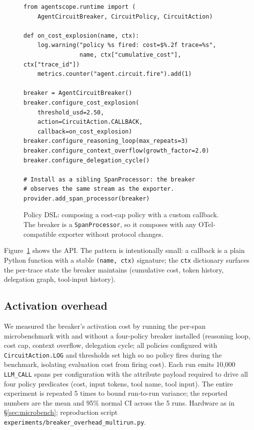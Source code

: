 \documentclass[sigplan,10pt,anonymous,review]{acmart}
\begin{document}
\begin{figure}[t]
\begin{lstlisting}
from agentscope.runtime import (
    AgentCircuitBreaker, CircuitPolicy, CircuitAction)

def on_cost_explosion(name, ctx):
    log.warning("policy %s fired: cost=$%.2f trace=%s",
                name, ctx["cumulative_cost"], ctx["trace_id"])
    metrics.counter("agent.circuit.fire").add(1)

breaker = AgentCircuitBreaker()
breaker.configure_cost_explosion(
    threshold_usd=2.50,
    action=CircuitAction.CALLBACK,
    callback=on_cost_explosion)
breaker.configure_reasoning_loop(max_repeats=3)
breaker.configure_context_overflow(growth_factor=2.0)
breaker.configure_delegation_cycle()

# Install as a sibling SpanProcessor: the breaker
# observes the same stream as the exporter.
provider.add_span_processor(breaker)
\end{lstlisting}
\caption{Policy DSL: composing a cost-cap policy with a custom
callback. The breaker is a \texttt{SpanProcessor}, so it composes
with any OTel-compatible exporter without protocol changes.}
\label{fig:policydsl}
\end{figure}

Figure~\ref{fig:policydsl} shows the API. The pattern is intentionally
small: a callback is a plain Python function with a stable
\texttt{(name, ctx)} signature; the \texttt{ctx} dictionary surfaces
the per-trace state the breaker maintains (cumulative cost, token
history, delegation graph, tool-input history).

\subsection{Activation overhead}
\label{sec:cb:overhead}

We measured the breaker's activation cost by running the per-span
microbenchmark with and without a four-policy breaker installed
(reasoning loop, cost cap, context overflow, delegation cycle; all
policies configured with \texttt{CircuitAction.LOG} and thresholds set
high so no policy fires during the benchmark, isolating evaluation cost
from firing cost). Each run emits 10{,}000 \texttt{LLM\_CALL} spans
per configuration with the attribute payload required to drive all four
policy predicates (cost, input tokens, tool name, tool input). The
entire experiment is repeated 5 times to bound run-to-run variance;
the reported numbers are the mean and 95\% normal CI across the 5
runs. Hardware as in \S\ref{sec:microbench}; reproduction script
\texttt{experiments/breaker\_overhead\_multirun.py}.
\end{document}
